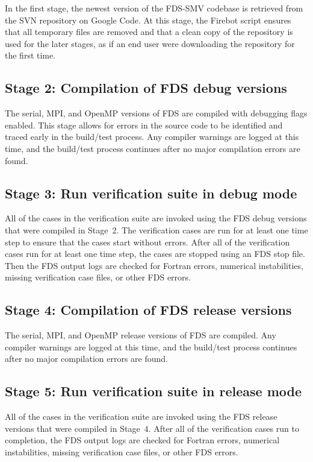\documentclass[11pt]{book}
\begin{document}
In the first stage, the newest version of the FDS-SMV codebase is retrieved from the SVN repository on Google Code. At this stage, the Firebot script ensures that all temporary files are removed and that a clean copy of the repository is used for the later stages, as if an end user were downloading the repository for the first time.

\subsection*{Stage 2: Compilation of FDS debug versions}

The serial, MPI, and OpenMP versions of FDS are compiled with debugging flags enabled. This stage allows for errors in the source code to be identified and traced early in the build/test process. Any compiler warnings are logged at this time, and the build/test process continues after no major compilation errors are found.

\subsection*{Stage 3: Run verification suite in debug mode}

All of the cases in the verification suite are invoked using the FDS debug versions that were compiled in Stage~2. The verification cases are run for at least one time step to ensure that the cases start without errors. After all of the verification cases run for at least one time step, the cases are stopped using an FDS stop file. Then the FDS output logs are checked for Fortran errors, numerical instabilities, missing verification case files, or other FDS errors.

\subsection*{Stage 4: Compilation of FDS release versions}

The serial, MPI, and OpenMP release versions of FDS are compiled. Any compiler warnings are logged at this time, and the build/test process continues after no major compilation errors are found.

\subsection*{Stage 5: Run verification suite in release mode}

All of the cases in the verification suite are invoked using the FDS release versions that were compiled in Stage~4. After all of the verification cases run to completion, the FDS output logs are checked for Fortran errors, numerical instabilities, missing verification case files, or other FDS errors.
\end{document}
